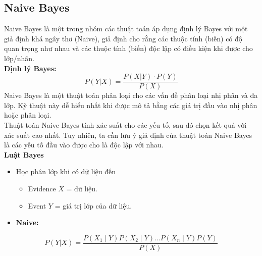 \documentclass[conference]{IEEEtran}
\begin{document}
\subsection{Naive Bayes} 
Naive Bayes là một trong nhóm các thuật toán áp dụng định lý Bayes với một giả định khá ngây thơ (Naive), giả định cho rằng các thuộc tính (biến) có độ quan trọng như nhau và các thuộc tính (biến) độc lập có điều kiện khi được cho lớp/nhãn.\\
\indent \textbf{Định lý Bayes:}
\[
P(Y|X) = \frac{P(X|Y) \cdot P(Y)}{P(X)}
\]
\indent Naive Bayes là một thuật toán phân loại cho các vấn đề phân loại nhị phân và đa lớp. Kỹ thuật này dễ hiểu nhất khi được mô tả bằng các giá trị đầu vào nhị phân hoặc phân loại.\\
\indent Thuật toán Naive Bayes tính xác suất cho các yếu tố, sau đó chọn kết quả với xác suất cao nhất. Tuy nhiên, ta cần lưu ý giả định của thuật toán Naive Bayes là các yếu tố đầu vào được cho là độc lập với nhau.\\
\textbf{Luật Bayes}
\begin{itemize}
    \item[] Học phân lớp khi có dữ liệu đến
    \begin{itemize}
        \item Evidence \( X \) = dữ liệu.
        \item Event \( Y \) = giá trị lớp của dữ liệu.
    \end{itemize}
    \item[] \noindent \textbf{Naive:}
\end{itemize}
\[
P(Y|X) = \frac{P(X_1 \mid Y) P(X_2 \mid Y) \dots P(X_n \mid Y) P(Y)}{P(X)}
\]
\end{document}
